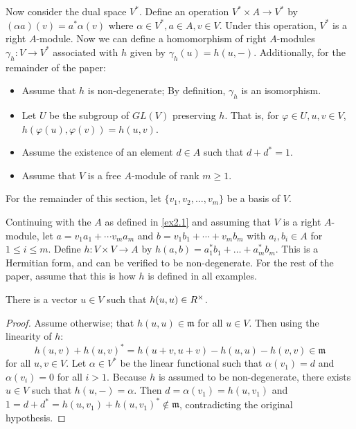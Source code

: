 Now consider the dual space $V^*$. Define an operation $V^* \times A \to V^*$ by $(\alpha a)(v) = a^* \alpha(v)$ where $\alpha \in V^*, a \in A, v \in V$.
Under this operation, $V^*$ is a right $A$-module.
Now we can define a homomorphism of right $A$-modules $\gamma_h: V \to V^*$ associated with $h$ given by $\gamma_h(u) = h(u, -)$.
Additionally, for the remainder of the paper:
\begin{itemize}
\item Assume that $h$ is non-degenerate; By definition, $\gamma_h$ is an isomorphism.
\item Let $U$ be the subgroup of $GL(V)$ preserving $h$. That is, for $\varphi \in U, u,v \in V$, $h(\varphi(u), \varphi(v)) = h(u,v)$.
\item Assume the existence of an element $d \in A$ such that $d + d^* = 1$.
\item Assume that $V$ is a free $A$-module of rank $m \ge 1$.
\end{itemize}
For the remainder of this section, let $\{v_1, v_2, \dotsc, v_m\}$ be a basis of $V$.

\begin{example}\label{ex2.2}
Continuing with the $A$ as defined in \cref{ex2.1} and assuming that $V$ is a right $A$-module,
let $a = v_1 a_1 + \dotsb v_m a_m$ and $b = v_1 b_1 + \dotsb + v_m b_m$ with $a_i, b_i \in A$ for $1 \le i \le m$.
Define $h: V \times V \to A$ by $h(a, b) = a_1^* b_1 + \dotsc + a_m^* b_m$.
This is a Hermitian form, and can be verified to be non-degenerate.
For the rest of the paper, assume that this is how $h$ is defined in all examples.
\end{example}

\begin{lemma}\label{lemma2.1}
There is a vector $u \in V$ such that $h(u,u) \in R^\times$.
\end{lemma}
\begin{proof}
Assume otherwise; that  $h(u,u) \in \mathfrak{m}$ for all $u \in V$.
Then using the linearity of $h$:
\[
h(u,v) + h(u,v)^* = h(u+v, u+v) - h(u,u) - h(v,v) \in \mathfrak{m}
\]
for all $u,v \in V$.
Let $\alpha \in V^*$ be the linear functional such that $\alpha(v_1) = d$ and $\alpha(v_i) = 0$ for all $i > 1$.
Because $h$ is assumed to be non-degenerate, there exists $u \in V$ such that $h(u,-) = \alpha$.
Then $d = \alpha(v_1) = h(u,v_1)$ and $1 = d + d^* = h(u,v_1) + h(u,v_1)^* \not\in \mathfrak{m}$, contradicting the original hypothesis.
\end{proof}

